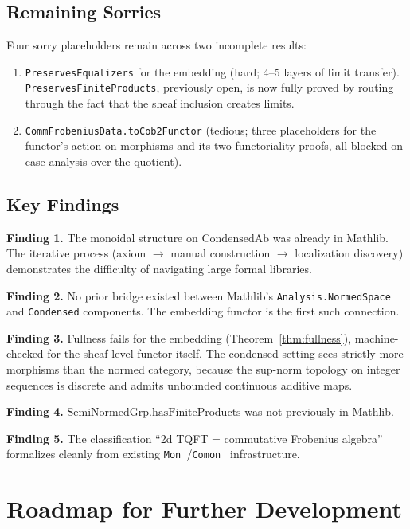 \documentclass[11pt]{amsart}
\theoremstyle{plain}
\theoremstyle{definition}
\newcommand{\CondAb}{\mathrm{CondensedAb}}
\newcommand{\SemiNormedGrp}{\mathrm{SemiNormedGrp}}
\begin{document}
\subsection{Remaining Sorries}

Four sorry placeholders remain across two incomplete results:
\begin{enumerate}
\item \texttt{PreservesEqualizers} for the embedding (hard; 4--5 layers of limit transfer). \texttt{PreservesFiniteProducts}, previously open, is now fully proved by routing through the fact that the sheaf inclusion creates limits.
\item \texttt{CommFrobeniusData.toCob2Functor} (tedious; three placeholders for the functor's action on morphisms and its two functoriality proofs, all blocked on case analysis over the quotient).
\end{enumerate}

\subsection{Key Findings}

\textbf{Finding 1.} The monoidal structure on $\CondAb$ was already in Mathlib. The iterative process (axiom $\to$ manual construction $\to$ localization discovery) demonstrates the difficulty of navigating large formal libraries.

\textbf{Finding 2.} No prior bridge existed between Mathlib's \texttt{Analysis.NormedSpace} and \texttt{Condensed} components. The embedding functor is the first such connection.

\textbf{Finding 3.} Fullness fails for the embedding (Theorem~\ref{thm:fullness}), machine-checked for the sheaf-level functor itself. The condensed setting sees strictly more morphisms than the normed category, because the sup-norm topology on integer sequences is discrete and admits unbounded continuous additive maps.

\textbf{Finding 4.} $\SemiNormedGrp.\mathrm{hasFiniteProducts}$ was not previously in Mathlib.

\textbf{Finding 5.} The classification ``2d TQFT = commutative Frobenius algebra''~\cite{Kock2003} formalizes cleanly from existing \texttt{Mon\_}/\texttt{Comon\_} infrastructure.

\section{Roadmap for Further Development}
\label{sec:roadmap}
\end{document}
